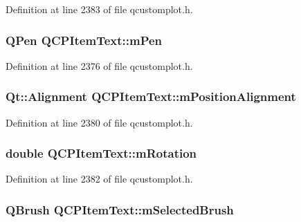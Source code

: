 Definition at line 2383 of file qcustomplot.\-h.

\hypertarget{class_q_c_p_item_text_aa02388705dbbff1bf7b8aa872b5f579c}{
\subsubsection[{m\-Pen}]{\setlength{\rightskip}{0pt plus 5cm}Q\-Pen Q\-C\-P\-Item\-Text\-::m\-Pen\hspace{0.3cm}{\ttfamily [protected]}}}\label{class_q_c_p_item_text_aa02388705dbbff1bf7b8aa872b5f579c}


Definition at line 2376 of file qcustomplot.\-h.

\hypertarget{class_q_c_p_item_text_a6c27f7dc1a962a04b32430cf99f04654}{
\subsubsection[{m\-Position\-Alignment}]{\setlength{\rightskip}{0pt plus 5cm}Qt\-::\-Alignment Q\-C\-P\-Item\-Text\-::m\-Position\-Alignment\hspace{0.3cm}{\ttfamily [protected]}}}\label{class_q_c_p_item_text_a6c27f7dc1a962a04b32430cf99f04654}


Definition at line 2380 of file qcustomplot.\-h.

\hypertarget{class_q_c_p_item_text_ac37df0061552225d2277e1ee3b48f2cb}{
\subsubsection[{m\-Rotation}]{\setlength{\rightskip}{0pt plus 5cm}double Q\-C\-P\-Item\-Text\-::m\-Rotation\hspace{0.3cm}{\ttfamily [protected]}}}\label{class_q_c_p_item_text_ac37df0061552225d2277e1ee3b48f2cb}


Definition at line 2382 of file qcustomplot.\-h.

\hypertarget{class_q_c_p_item_text_a28ccd097b42a216d81db9c6869f54a59}{
\subsubsection[{m\-Selected\-Brush}]{\setlength{\rightskip}{0pt plus 5cm}Q\-Brush Q\-C\-P\-Item\-Text\-::m\-Selected\-Brush\hspace{0.3cm}{\ttfamily [protected]}}}\label{class_q_c_p_item_text_a28ccd097b42a216d81db9c6869f54a59}


